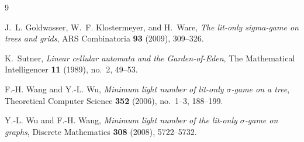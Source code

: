 \documentclass[11pt,a4paper]{article}
\theoremstyle{definition}
\begin{document}
\begin{thebibliography}{9}

J.~L. Goldwasser, W.~F. Klostermeyer, and H.~Ware,
\emph{The lit-only sigma-game on trees and grids},
ARS Combinatoria \textbf{93} (2009), 309--326.

K.~Sutner,
\emph{Linear cellular automata and the Garden-of-Eden},
The Mathematical Intelligencer \textbf{11} (1989), no.~2, 49--53.

F.-H. Wang and Y.-L. Wu,
\emph{Minimum light number of lit-only $\sigma$-game on a tree},
Theoretical Computer Science \textbf{352} (2006), no.~1--3, 188--199.

Y.-L. Wu and F.-H. Wang,
\emph{Minimum light number of the lit-only $\sigma$-game on graphs},
Discrete Mathematics \textbf{308} (2008), 5722--5732.

\end{thebibliography}
\end{document}
